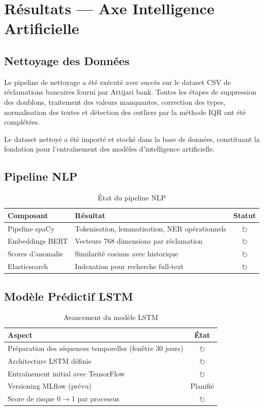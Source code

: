 \documentclass[12pt,a4paper]{report}
\newcommand{\inprog}{\textcolor{blueProgress}{$\circlearrowright$}}
\begin{document}
\chapter{Résultats --- Axe Intelligence Artificielle}

\section{Nettoyage des Données}

Le pipeline de nettoyage a été exécuté avec succès sur le dataset CSV de réclamations bancaires fourni par Attijari bank. Toutes les étapes de suppression des doublons, traitement des valeurs manquantes, correction des types, normalisation des textes et détection des outliers par la méthode IQR ont été complétées.

Le dataset nettoyé a été importé et stocké dans la base de données, constituant la fondation pour l'entraînement des modèles d'intelligence artificielle.

\section{Pipeline NLP}

\begin{table}[H]
\centering
\caption{État du pipeline NLP}
\begin{tabularx}{\textwidth}{|l|X|c|}
\hline
\textbf{Composant} & \textbf{Résultat} & \textbf{Statut} \\
\hline
Pipeline spaCy & Tokenisation, lemmatisation, NER opérationnels & \inprog \\
\hline
Embeddings BERT & Vecteurs 768 dimensions par réclamation & \inprog \\
\hline
Scores d'anomalie & Similarité cosinus avec historique & \inprog \\
\hline
Elasticsearch & Indexation pour recherche full-text & \inprog \\
\hline
\end{tabularx}
\end{table}

\section{Modèle Prédictif LSTM}

\begin{table}[H]
\centering
\caption{Avancement du modèle LSTM}
\begin{tabularx}{\textwidth}{|X|c|}
\hline
\textbf{Aspect} & \textbf{État} \\
\hline
Préparation des séquences temporelles (fenêtre 30 jours) & \inprog \\
\hline
Architecture LSTM définie & \inprog \\
\hline
Entraînement initial avec TensorFlow & \inprog \\
\hline
Versioning MLflow (prévu) & Planifié \\
\hline
Score de risque 0$\rightarrow$1 par processus & \inprog \\
\hline
\end{tabularx}
\end{table}
\end{document}
